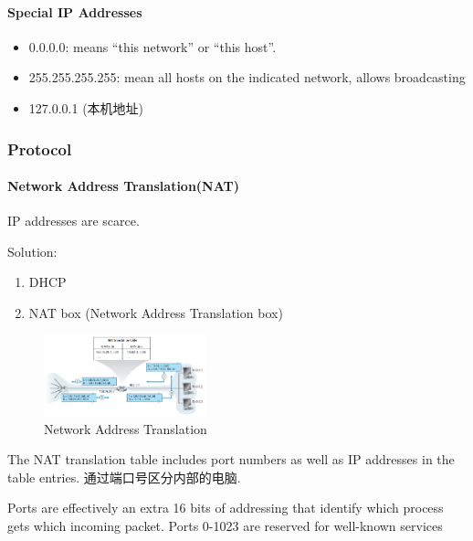 
\paragraph{Special IP Addresses}\quad 
\begin{itemize}
    \item 0.0.0.0:  means ``this network'' or ``this host''.
    \item 255.255.255.255: mean all hosts on the indicated network, allows broadcasting
    \item 127.0.0.1 (本机地址)
\end{itemize}

\subsubsection{Protocol} %

\paragraph{Network Address Translation(NAT)}
IP addresses are scarce.

Solution:
\begin{enumerate}
    \item DHCP
    \item NAT box (Network Address Translation box)
\end{enumerate}

\begin{figure}[!htb]
    \centering
    \includegraphics[width=0.42\textwidth]{pic/CN5/Network Address Translation}
    \caption{Network Address Translation}
\end{figure}
The NAT translation table includes port numbers as well as IP addresses in the table entries. 通过端口号区分内部的电脑. 

Ports are effectively an extra 16 bits of addressing that identify which process gets which incoming packet. Ports 0-1023 are reserved for well-known services

